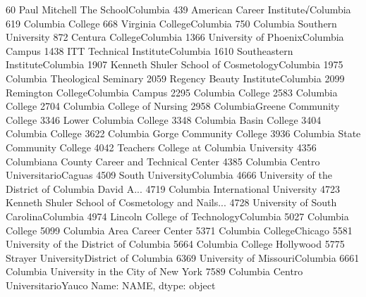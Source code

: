 \documentclass[letterpaper,10pt,english]{jupyterBook}
\begin{document}
\begin{sphinxVerbatim}[commandchars=\\\{\}]
60                      Paul Mitchell The School\PYGZhy{}Columbia
439                    American Career Institute√Columbia
619                                      Columbia College
668                             Virginia College\PYGZhy{}Columbia
750                          Columbia Southern University
872                              Centura College\PYGZhy{}Columbia
1366                University of Phoenix\PYGZhy{}Columbia Campus
1438                     ITT Technical Institute\PYGZhy{}Columbia
1610                      Southeastern Institute\PYGZhy{}Columbia
1907        Kenneth Shuler School of Cosmetology\PYGZhy{}Columbia
1975                        Columbia Theological Seminary
2059                    Regency Beauty Institute\PYGZhy{}Columbia
2099                    Remington College\PYGZhy{}Columbia Campus
2295                                     Columbia College
2583                                     Columbia College
2704                          Columbia College of Nursing
2958                    Columbia\PYGZhy{}Greene Community College
3346                               Lower Columbia College
3348                               Columbia Basin College
3404                                     Columbia College
3622                     Columbia Gorge Community College
3936                     Columbia State Community College
4042              Teachers College at Columbia University
4356        Columbiana County Career and Technical Center
4385                 Columbia Centro Universitario\PYGZhy{}Caguas
4509                            South University\PYGZhy{}Columbia
4666    University of the District of Columbia David A...
4719                    Columbia International University
4723    Kenneth Shuler School of Cosmetology and Nails...
4728                University of South Carolina\PYGZhy{}Columbia
4974               Lincoln College of Technology\PYGZhy{}Columbia
5027                                     Columbia College
5099                          Columbia Area Career Center
5371                             Columbia College\PYGZhy{}Chicago
5581               University of the District of Columbia
5664                           Columbia College Hollywood
5775              Strayer University\PYGZhy{}District of Columbia
6369                      University of Missouri\PYGZhy{}Columbia
6661          Columbia University in the City of New York
7589                  Columbia Centro Universitario\PYGZhy{}Yauco
Name: NAME, dtype: object
\end{sphinxVerbatim}
\end{document}
